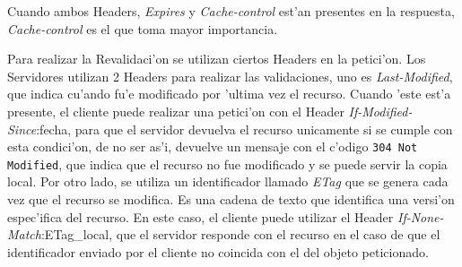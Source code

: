 Cuando ambos Headers, \textsl{Expires} y \textsl{Cache-control} est'an presentes en la respuesta, \textsl{Cache-control} es el que toma mayor importancia.

Para realizar la Revalidaci'on se utilizan ciertos Headers en la petici'on. Los Servidores utilizan 2 Headers para realizar las validaciones, uno es \textsl{Last-Modified}, que indica cu'ando fu'e modificado por 'ultima vez el recurso. Cuando 'este est'a presente, el cliente puede realizar una petici'on con el Header \textsl{If-Modified-Since}:fecha, para que el servidor devuelva el recurso unicamente si se cumple con esta condici'on, de no ser as'i, devuelve un mensaje con el c'odigo \texttt{304 Not Modified}, que indica que el recurso no fue modificado y se puede servir la copia local.
Por otro lado, se utiliza un identificador llamado \textsl{ETag} que se genera cada vez que el recurso se modifica. Es una cadena de texto que identifica una versi'on espec'ifica del recurso. En este caso, el cliente puede utilizar el Header \textsl{If-None-Match}:ETag\_local, que el servidor responde con el recurso en el caso de que el identificador enviado por el cliente no coincida con el del objeto peticionado.